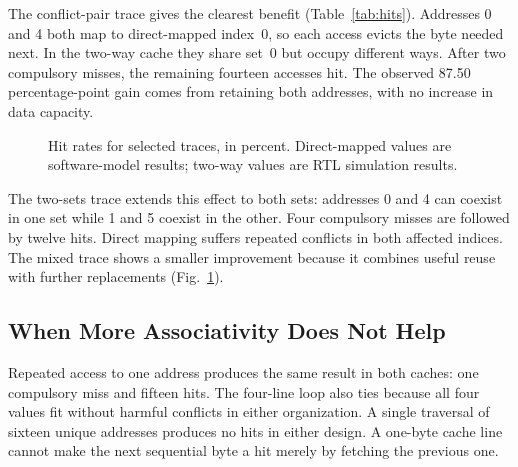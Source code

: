 \documentclass[conference]{IEEEtran}
\begin{document}
The conflict-pair trace gives the clearest benefit
(Table~\ref{tab:hits}). Addresses 0 and 4 both map to direct-mapped
index~0, so each access evicts the byte needed next. In the two-way
cache they share set~0 but occupy different ways. After two compulsory
misses, the remaining fourteen accesses hit. The observed 87.50
percentage-point gain comes from retaining both addresses, with no
increase in data capacity.

\begin{figure}[!t]
\centering
{}
\caption{Hit rates for selected traces, in percent. Direct-mapped values
are software-model results; two-way values are RTL simulation results.}
\label{fig:hits}
\end{figure}

The two-sets trace extends this effect to both sets: addresses 0 and 4
can coexist in one set while 1 and 5 coexist in the other. Four
compulsory misses are followed by twelve hits. Direct mapping suffers
repeated conflicts in both affected indices. The mixed trace shows a
smaller improvement because it combines useful reuse with further
replacements (Fig.~\ref{fig:hits}).

\subsection{When More Associativity Does Not Help}

Repeated access to one address produces the same result in both caches:
one compulsory miss and fifteen hits. The four-line loop also ties
because all four values fit without harmful conflicts in either
organization. A single traversal of sixteen unique addresses produces
no hits in either design. A one-byte cache line cannot make the next
sequential byte a hit merely by fetching the previous one.
\end{document}
